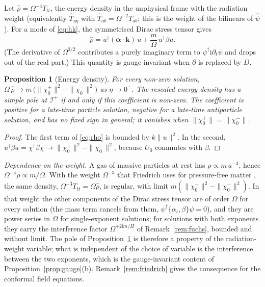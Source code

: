 \documentclass[11pt,a4paper]{article}
\newtheorem{proposition}{Proposition}
\theoremstyle{definition}
\newcommand{\scri}{\mathscr{I}^{+}}
\newcommand{\ii}{\mathrm{i}}
\newcommand{\hpsi}{\hat\psi}
\begin{document}
Let $\hat\rho=\Omega^{-4}T_{tt}$, the energy density in the unphysical frame with the radiation weight (equivalently $\hat T_{\eta\eta}$ with $\hat T_{ab}=\Omega^{-2}T_{ab}$; this is the weight of the bilinears of $\hpsi$). For a mode of \eqref{eq:hk}, the symmetrised Dirac stress tensor gives
\begin{equation}
\hat\rho=u^{\dagger}(\boldsymbol\alpha\cdot\mathbf{k})\,u+\frac{m}{\Omega}\,u^{\dagger}\beta u .
\label{eq:rho}
\end{equation}
(The derivative of $\Omega^{3/2}$ contributes a purely imaginary term to $\psi^{\dagger}\ii\partial_{t}\psi$ and drops out of the real part.) This quantity is gauge invariant when $\partial$ is replaced by $D$.

\begin{proposition}[Energy density]
\label{prop:energy}
For every non-zero solution, $\Omega\,\hat\rho\to m\,\big(\|\chi_{0}^{+}\|^{2}-\|\chi_{0}^{-}\|^{2}\big)$ as $\eta\to0^{-}$. The rescaled energy density has a simple pole at $\scri$ if and only if this coefficient is non-zero. The coefficient is positive for a late-time particle solution, negative for a late-time antiparticle solution, and has no fixed sign in general; it vanishes when $\|\chi_{0}^{+}\|=\|\chi_{0}^{-}\|$.
\end{proposition}
\begin{proof}
The first term of \eqref{eq:rho} is bounded by $k\|u\|^{2}$. In the second, $u^{\dagger}\beta u=\chi^{\dagger}\beta\chi\to\|\chi_{0}^{+}\|^{2}-\|\chi_{0}^{-}\|^{2}$, because $U_{0}$ commutes with $\beta$.
\end{proof}

\emph{Dependence on the weight.} A gas of massive particles at rest has $\rho\propto m\,a^{-3}$, hence $\Omega^{-4}\rho\propto m/\Omega$. With the weight $\Omega^{-3}$ that Friedrich uses for pressure-free matter \cite{Friedrich2017}, the same density, $\Omega^{-3}T_{tt}=\Omega\hat\rho$, is regular, with limit $m(\|\chi_{0}^{+}\|^{2}-\|\chi_{0}^{-}\|^{2})$. In that weight the other components of the Dirac stress tensor are of order $\Omega$ for every solution (the mass term cancels from them, $\psi^{\dagger}\{\alpha_{i},\beta\}\psi=0$), and they are power series in $\Omega$ for single-exponent solutions; for solutions with both exponents they carry the interference factor $\Omega^{\mp2\ii m/H}$ of Remark~\ref{rem:fuchs}, bounded and without limit. The pole of Proposition~\ref{prop:energy} is therefore a property of the radiation-weight variable; what is independent of the choice of variable is the interference between the two exponents, which is the gauge-invariant content of Proposition~\ref{prop:gauge}(b). Remark~\ref{rem:friedrich} gives the consequence for the conformal field equations.
\end{document}
